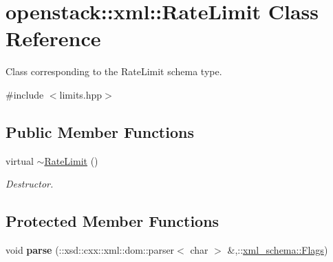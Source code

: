 \hypertarget{classopenstack_1_1xml_1_1RateLimit}{
\section{openstack::xml::RateLimit Class Reference}
\label{classopenstack_1_1xml_1_1RateLimit}
}


Class corresponding to the RateLimit schema type.  




{\ttfamily \#include $<$limits.hpp$>$}

\subsection*{Public Member Functions}
\begin{DoxyCompactItemize}
\item 
\hypertarget{classopenstack_1_1xml_1_1RateLimit_afdb3cc48cc897518a63ce4cd88052c94}{
virtual \hyperlink{classopenstack_1_1xml_1_1RateLimit_afdb3cc48cc897518a63ce4cd88052c94}{$\sim$RateLimit} ()}
\label{classopenstack_1_1xml_1_1RateLimit_afdb3cc48cc897518a63ce4cd88052c94}

\begin{DoxyCompactList}\small\item\em Destructor. \item\end{DoxyCompactList}\end{DoxyCompactItemize}
\subsection*{Protected Member Functions}
\begin{DoxyCompactItemize}
\item 
\hypertarget{classopenstack_1_1xml_1_1RateLimit_a31c7d433fc41b984db24d187a737a399}{
void {\bfseries parse} (::xsd::cxx::xml::dom::parser$<$ char $>$ \&,::\hyperlink{namespacexml__schema_affb4c227cbd9aa7453dd1dc5a1401943}{xml\_\-schema::Flags})}
\label{classopenstack_1_1xml_1_1RateLimit_a31c7d433fc41b984db24d187a737a399}

\end{DoxyCompactItemize}
